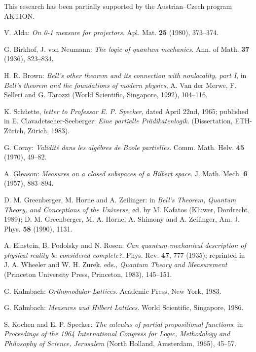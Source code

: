 This research has been partially supported by the Austrian--Czech program
AKTION.




\begin{thebibliography}{99}

 V. Alda:
{\em On\/ {\rm 0-1} measure for projectors}.
Apl. Mat. {\bf 25} (1980), 373--374.

 G. Birkhof, J. von Neumann:
{\em The logic of quantum mechanics}.
Ann. of Math. {\bf 37} (1936), 823--834.

 H. R. Brown:
{\em Bell's other theorem and its connection with nonlocality, part I},
in
{\em Bell's theorem and the foundations of modern physics}, A. Van der
Merwe, F. Selleri and G. Tarozzi (World Scientific, Singapore, 1992),
104--116.

K. Sch\"uette, {\em letter to Professor E. P. Specker,} dated April
22nd, 1965; published in
E. Clavadetscher-Seeberger: {\it Eine partielle Pr\"adikatenlogik}.
(Dissertation, ETH-Z\"urich, Z\"urich, 1983).

 G. Coray:
{\em Validit\'e dans les alg\'ebres de Boole partielles}.
Comm. Math. Helv. {\bf 45} (1970), 49--82.

 A. Gleason:
{\em Measures on a closed subspaces of a Hilbert space}.
J. Math. Mech. {\bf 6} (1957), 883--894.

 D. M. Greenberger, M. Horne and A. Zeilinger:
in {\sl Bell's Theorem, Quantum Theory, and Conceptions of the Universe},
ed. by M. Kafatos (Kluwer, Dordrecht, 1989);
D. M. Greenberger, M. A. Horne, A. Shimony and A. Zeilinger,
Am. J. Phys. {\bf 58} (1990), 1131.

 A. Einstein, B. Podolsky and N. Rosen:
{\em Can quantum-mechanical description of physical reality be considered
complete?}. Phys. Rev. {\bf 47}, 777 (1935); reprinted in J. A. Wheeler and
W. H. Zurek, eds., {\em Quantum Theory and Measurement\/} (Princeton
University Press, Princeton, 1983), 145--151.

 G. Kalmbach:
{\em Orthomodular Lattices}. Academic Press, New York, 1983.

 G. Kalmbach:
{\em Measures and Hilbert Lattices}. World Scientific, Singapore, 1986.

S. Kochen and E. P. Specker:
{\em The calculus of partial propositional functions}, in
{\em Proceedings of the 1964 International Congress for Logic,
Methodology and Philosophy of Science, Jerusalem\/} (North Holland,
Amsterdam, 1965), 45--57.


\end{thebibliography}
